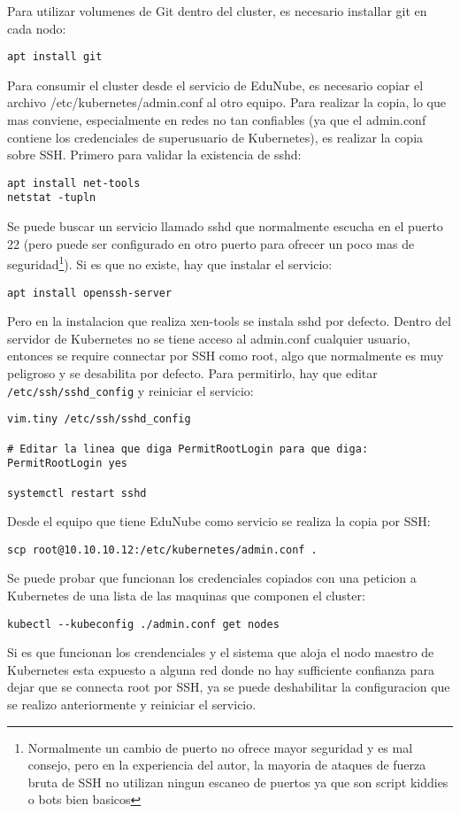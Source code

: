 Para utilizar volumenes de Git dentro del cluster, es necesario installar git en cada nodo:
\begin{lstlisting}
apt install git
\end{lstlisting}

Para consumir el cluster desde el servicio de EduNube, es necesario copiar el archivo /etc/kubernetes/admin.conf al otro equipo. Para realizar la copia, lo que mas conviene, especialmente en redes no tan confiables (ya que el admin.conf contiene los credenciales de superusuario de Kubernetes), es realizar la copia sobre SSH. Primero para validar la existencia de sshd:
\begin{lstlisting}
apt install net-tools
netstat -tupln
\end{lstlisting}
Se puede buscar un servicio llamado sshd que normalmente escucha en el puerto 22 (pero puede ser configurado en otro puerto para ofrecer un poco mas de seguridad\footnote{Normalmente un cambio de puerto no ofrece mayor seguridad y es mal consejo, pero en la experiencia del autor, la mayoria de ataques de fuerza bruta de SSH no utilizan ningun escaneo de puertos ya que son script kiddies o bots bien basicos}). Si es que no existe, hay que instalar el servicio:
\begin{lstlisting}
apt install openssh-server
\end{lstlisting}
Pero en la instalacion que realiza xen-tools se instala sshd por defecto. Dentro del servidor de Kubernetes no se tiene acceso al admin.conf cualquier usuario, entonces se require connectar por SSH como root, algo que normalmente es muy peligroso y se desabilita por defecto. Para permitirlo, hay que editar \texttt{/etc/ssh/sshd\_config} y reiniciar el servicio:
\begin{lstlisting}
vim.tiny /etc/ssh/sshd_config

# Editar la linea que diga PermitRootLogin para que diga:
PermitRootLogin yes

systemctl restart sshd
\end{lstlisting}

Desde el equipo que tiene EduNube como servicio se realiza la copia por SSH:
\begin{lstlisting}
scp root@10.10.10.12:/etc/kubernetes/admin.conf .
\end{lstlisting}
Se puede probar que funcionan los credenciales copiados con una peticion a Kubernetes de una lista de las maquinas que componen el cluster:
\begin{lstlisting}
kubectl --kubeconfig ./admin.conf get nodes
\end{lstlisting}
Si es que funcionan los crendenciales y el sistema que aloja el nodo maestro de Kubernetes esta expuesto a alguna red donde no hay sufficiente confianza para dejar que se connecta root por SSH, ya se puede deshabilitar la configuracion que se realizo anteriormente y reiniciar el servicio.

